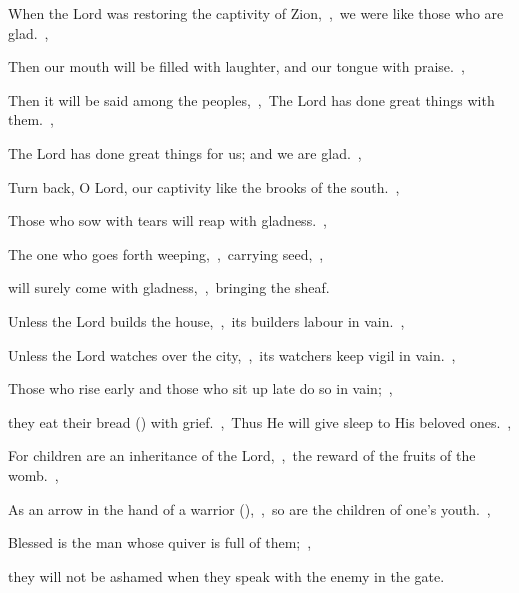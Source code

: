 \documentclass[12pt,twoside,a5paper]{article}
\begin{document}

\begin{normalparskip}
  When the Lord was restoring the captivity of Zion,~\sep\ we were like those who are glad.~\sep


  Then our mouth will be filled with laughter, and our tongue with praise.~\sep

  Then it will be said among the peoples,~\sep\ The Lord has done great things with them.~\sep

  The Lord has done great things for us; and we are glad.~\sep

  Turn back, O Lord, our captivity like the brooks of the south.~\sep

  Those who sow with tears will reap with gladness.~\sep

  The one who goes forth weeping,~\sep\ carrying seed,~\sep

  will surely come with gladness,~\sep\ bringing the sheaf.
\end{normalparskip}


\begin{normalparskip}
  Unless the Lord builds the house,~\sep\ its builders labour in vain.~\sep


  Unless the Lord watches over the city,~\sep\ its watchers keep vigil in vain.~\sep

  Those who rise early and those who sit up late do so in vain;~\sep

  they eat their bread () with grief.~\sep\ Thus He will give sleep to His beloved ones.~\sep

  For children are an inheritance of the Lord,~\sep\ the reward of the fruits of the womb.~\sep

  As an arrow in the hand of a warrior (),~\sep\ so are the children of one's youth.~\sep

  Blessed is the man whose quiver is full of them;~\sep

  they will not be ashamed when they speak with the enemy in the gate.
\end{normalparskip}

\end{document}
